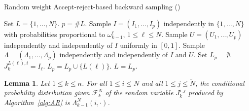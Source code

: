 \documentclass[12pt]{article}
\newcommand{\1}{\mathrm{1}}
\newtheorem{lemma}{Lemma}
\begin{document}
\begin{algorithm}
\caption{Random weight Accept-reject-based backward sampling  (\cite{douc:garivier:moulines:olsson:2011})}
\begin{algorithmic}
\STATE Set $L =\{1,\ldots,N\}$. 
\STATE $p = \#L$.
\STATE Sample $I = (I_1,\ldots,I_p)$ independently in $\{1,\ldots,N\}$ with probabilities proportional to $\omega_{k-1}^{\ell}$, $1\le \ell\le N$.
\STATE Sample $U = (U_1,\ldots,U_p)$ independently and independently of $I$ uniformly in $[0,1]$.
\STATE Sample $\Lambda = (\Lambda_1,\ldots,\Lambda_p)$ independently and independently of $I$ and $U$.
\STATE Set $L_p = \emptyset$.
\STATE $J_k^{L(\ell),i} = I_\ell$.
\ELSE
\STATE $L_p = L_p \cup \{L(\ell)\}$.
\ENDIF
\ENDFOR
\STATE $L = L_p$.
\ENDWHILE
\ENDFOR
\end{algorithmic}
\label{alg:AR}
\end{algorithm}

\begin{lemma}
\label{lem:AR:unbiased}
Let $1\le k\le n$.  For all $1\le i \le N$ and all $1\le j \le \widetilde{N}$, the conditional probability distribution given $\mathcal{F}_k^N$ of the random variable $J_k^{i,j}$ produced by Algorithm~\ref{alg:AR} is  $\Lambda_{k-1}^N(i,\cdot)$. 
\end{lemma}
\end{document}
